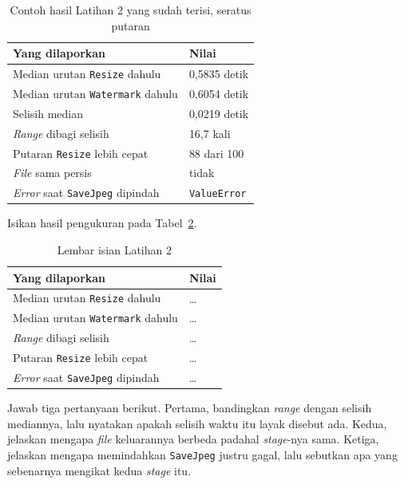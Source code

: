 \begin{table}[htbp]
  \centering
  \caption{Contoh hasil Latihan 2 yang sudah terisi, seratus putaran}
  \label{tab:lat2pipa-contoh}
  \begin{tabularx}{\textwidth}{|X|l|}
    \hline
    \textbf{Yang dilaporkan} & \textbf{Nilai} \\
    \hline
    Median urutan \texttt{Resize} dahulu & 0,5835 detik \\
    \hline
    Median urutan \texttt{Watermark} dahulu & 0,6054 detik \\
    \hline
    Selisih median & 0,0219 detik \\
    \hline
    \textit{Range} dibagi selisih & 16,7 kali \\
    \hline
    Putaran \texttt{Resize} lebih cepat & 88 dari 100 \\
    \hline
    \textit{File} sama persis & tidak \\
    \hline
    \textit{Error} saat \texttt{SaveJpeg} dipindah & \texttt{ValueError} \\
    \hline
  \end{tabularx}
\end{table}

Isikan hasil pengukuran pada Tabel~\ref{tab:lat2pipa-hasil}.

\begin{table}[htbp]
  \centering
  \caption{Lembar isian Latihan 2}
  \label{tab:lat2pipa-hasil}
  \begin{tabularx}{\textwidth}{|X|l|}
    \hline
    \textbf{Yang dilaporkan} & \textbf{Nilai} \\
    \hline
    Median urutan \texttt{Resize} dahulu & \dots \\
    \hline
    Median urutan \texttt{Watermark} dahulu & \dots \\
    \hline
    \textit{Range} dibagi selisih & \dots \\
    \hline
    Putaran \texttt{Resize} lebih cepat & \dots \\
    \hline
    \textit{Error} saat \texttt{SaveJpeg} dipindah & \dots \\
    \hline
  \end{tabularx}
\end{table}

Jawab tiga pertanyaan berikut. Pertama, bandingkan \textit{range} dengan
selisih mediannya, lalu nyatakan apakah selisih waktu itu layak disebut ada.
Kedua, jelaskan mengapa \textit{file} keluarannya berbeda padahal
\textit{stage}-nya sama. Ketiga, jelaskan mengapa memindahkan \texttt{SaveJpeg}
justru gagal, lalu sebutkan apa yang sebenarnya mengikat kedua \textit{stage}
itu.

